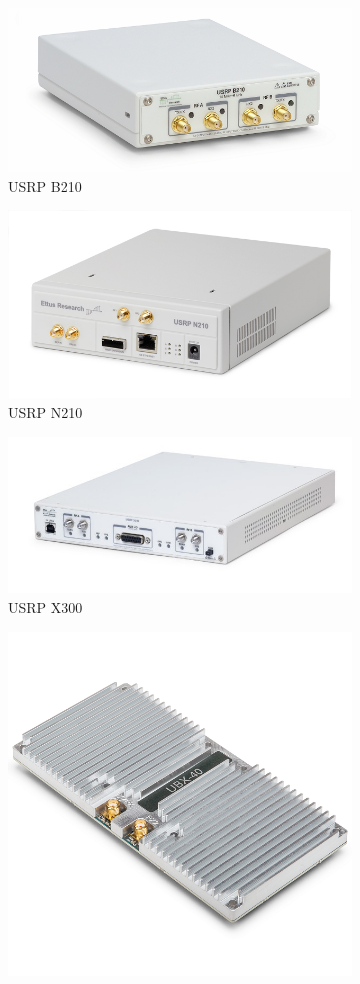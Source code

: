 \begin{figure}[htb]
    \centering
    \begin{subfigure}[htb]{0.45\textwidth}
        \centering
        \includegraphics[width=0.7\linewidth]{figures/b210}
        \caption{USRP B210\cite{B210}}
        \label{fig:b210}
    \end{subfigure}
    \begin{subfigure}[htb]{0.45\textwidth}
        \centering
        \includegraphics[width=0.7\linewidth]{figures/n210}
        \caption{USRP N210\cite{N210}}
        \label{fig:n210}
    \end{subfigure}
    \begin{subfigure}[htb]{0.5\textwidth}
        \centering
        \includegraphics[width=0.7\linewidth]{figures/x310}
        \caption{USRP X300\cite{X300}}
        \label{fig:x300}
    \end{subfigure}
    \begin{subfigure}[htb]{0.4\textwidth}
        \centering
        \includegraphics[width=0.6\linewidth]{figures/UBX40}

\end{subfigure}
\end{figure}
